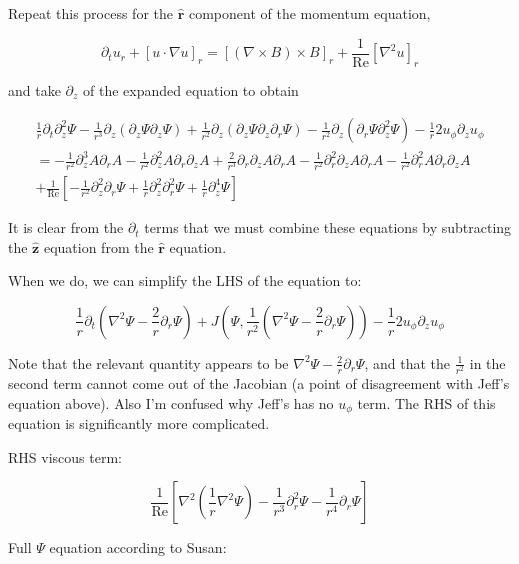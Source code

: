 \documentclass{paper}
\newcommand{\beq}{\begin{equation}}
\newcommand{\eeq}{\end{equation}}
\newcommand{\rhat}{\ensuremath{\mathbf{\hat{r}}}}
\newcommand{\zhat}{\ensuremath{\mathbf{\hat{z}}}}
\newcommand\reye{\mathrm{Re}}
\begin{document}
Repeat this process for the $\rhat$ component of the momentum equation,

\beq
\partial_t u_r + \left[u \cdot \nabla u \right]_r = \left[ \left( \nabla \times B \right) \times B \right]_r + \frac{1}{\reye}\left[ \nabla^2 u \right] _r
\eeq

and take $\partial_z$ of the expanded equation to obtain

\begin{multline}
\frac{1}{r} \partial_t \partial_z^2 \Psi - \frac{1}{r^3} \partial_z \left(\partial_z \Psi \partial_z \Psi\right) + \frac{1}{r^2} \partial_z\left(\partial_z\Psi \partial_z\partial_r \Psi\right) - \frac{1}{r^2} \partial_z \left(\partial_r \Psi \partial_z^2 \Psi\right) - \frac{1}{r} 2 u_\phi \partial_z u_\phi \\
= - \frac{1}{r^2} \partial_z^3 A \partial_r A - \frac{1}{r^2} \partial_z^2 A \partial_r \partial_z A + \frac{2}{r^3} \partial_r\partial_z A \partial_r A - \frac{1}{r^2} \partial_r^2 \partial_z A \partial_rA - \frac{1}{r^2} \partial_r^2 A \partial_r \partial_z A \\
+ \frac{1}{\reye} \left[ -\frac{1}{r^2} \partial_z^2 \partial_r \Psi + \frac{1}{r} \partial_z^2 \partial_r^2 \Psi + \frac{1}{r} \partial_z^4\Psi \right]
\end{multline}

It is clear from the $\partial_t$ terms that we must combine these equations by subtracting the $\zhat$ equation from the $\rhat$ equation.

When we do, we can simplify the LHS of the equation to:

\beq
\frac{1}{r}\partial_t \left(\nabla^2 \Psi - \frac{2}{r} \partial_r \Psi \right) + J\left(\Psi, \frac{1}{r^2} \left( \nabla^2 \Psi - \frac{2}{r} \partial_r\Psi\right) \right) - \frac{1}{r} 2 u_\phi \partial_z u_\phi
\eeq

Note that the relevant quantity appears to be $\nabla^2 \Psi - \frac{2}{r} \partial_r \Psi$, and that the $\frac{1}{r^2}$ in the second term cannot come out of the Jacobian (a point of disagreement with Jeff's equation above). Also I'm confused why Jeff's has no $u_\phi$ term. The RHS of this equation is significantly more complicated.

RHS viscous term:

\beq
\frac{1}{\reye} \left[ \nabla^2 \left(\frac{1}{r} \nabla^2 \Psi\right) - \frac{1}{r^3} \partial_r^2 \Psi - \frac{1}{r^4}\partial_r\Psi\right]
\eeq

Full $\Psi$ equation according to Susan:
\end{document}
